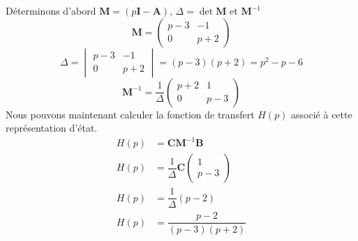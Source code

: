 \newcommand{\bdM}{\boldsymbol{M}}
\newcommand{\bdI}{\boldsymbol{I}}
\newcommand{\bdA}{\boldsymbol{A}}
\newcommand{\bdB}{\boldsymbol{B}}
\newcommand{\bdC}{\boldsymbol{C}}
Déterminons d'abord $\bdM=(p\bdI-\bdA)$, $\Delta=\det{\bdM}$ et $\bdM^{-1}$
\[
    \bdM=
    \begin{pmatrix} 
        p-3 & -1\\
        0 & p+2 
    \end{pmatrix}
\]
\[
    \Delta=
    \begin{vmatrix} 
        p-3 & -1\\
        0 & p+2 
    \end{vmatrix}=(p-3)(p+2)=p^2-p-6
\]
\[
    \bdM^{-1}=
    \dfrac{1}{\Delta}
    \begin{pmatrix} 
        p+2 &  1\\
        0 & p-3 
    \end{pmatrix}
\]
Nous pouvons maintenant calculer la fonction de transfert $H(p)$ associé à
cette représentation d'état.
\begin{align*}
    H(p)&=\bdC\bdM^{-1}\bdB\\
    H(p)&=\dfrac{1}{\Delta}\bdC\begin{pmatrix}1\\p-3\end{pmatrix}\\
    H(p)&=\dfrac{1}{\Delta}(p-2)\\
    H(p)&=\dfrac{p-2}{(p-3)(p+2)}
\end{align*}

